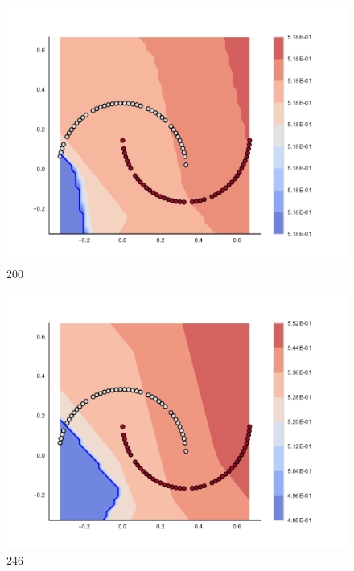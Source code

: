 \begin{subfigure}[b]{0.09\textwidth}
    \includegraphics[clip, trim=2.35cm 1.75cm 4.5cm 0cm,width=\textwidth]{img/convergence/200.pdf}
    \caption{200}
    \label{fig:convergence_200}
\end{subfigure}
%
\begin{subfigure}[b]{0.09\textwidth}
    \includegraphics[clip, trim=2.35cm 1.75cm 4.5cm 0cm,width=\textwidth]{img/convergence/246.pdf}
    \caption{246}
    \label{fig:convergence_246}
\end{subfigure}
%
